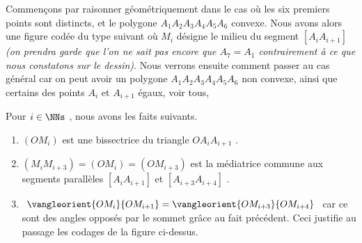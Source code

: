 Commençons par raisonner géométriquement dans le cas où les six premiers points sont distincts, et le polygone $A_1 A_2 A_3 A_4 A_5 A_6$ convexe.
Nous avons alors une figure codée du type suivant où $M_i$ désigne le milieu du segment $[A_i A_{i+1}]$ 
\emph{(on prendra garde que l'on ne sait pas encore que $A_7 = A_1$ contrairement à ce que nous constatons sur le dessin)}.
Nous verrons ensuite comment passer au cas général car on peut avoir un polygone $A_1 A_2 A_3 A_4 A_5 A_6$ non convexe, ainsi que certains des points $A_i$ et $A_{i+1}$ égaux, voir tous, 

\vspace{1em}

\begin{center}
\end{center}

\vspace{1em}




Pour $i \in \NNs$ , nous avons les faits suivants.
\begin{enumerate}
	\item $(OM_i)$ est une bissectrice du triangle $O A_i A_{i+1}$ .

	\item $(M_i M_{i+3}) = (O M_i) = (O M_{i+3})$ est la médiatrice commune aux segments parallèles $[A_i A_{i+1}]$ et $[A_{i+3} A_{i+4}]$ .

	\item $\vangleorient{OM_i}{OM_{i+1}} = \vangleorient{OM_{i+3}}{OM_{i+4}}$ car ce sont des angles opposés par le sommet grâce au fait précédent. Ceci justifie au passage les codages de la figure ci-dessus.
\end{enumerate}



